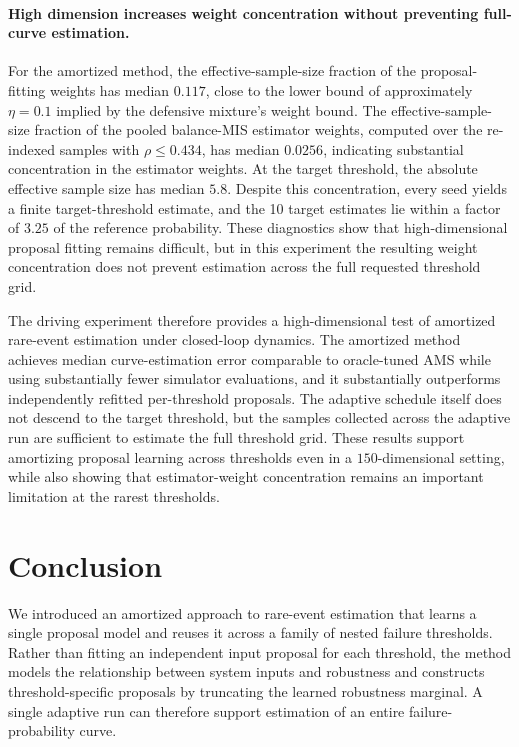 \documentclass[twoside,11pt]{article}
\begin{document}
\paragraph{High dimension increases weight concentration without preventing full-curve estimation.}
For the amortized method, the effective-sample-size fraction of the proposal-fitting weights has median \(0.117\), close to the lower bound of approximately \(\eta=0.1\) implied by the defensive mixture's weight bound. The effective-sample-size fraction of the pooled balance-MIS estimator weights, computed over the re-indexed samples with \(\rho\leq0.434\), has median \(0.0256\), indicating substantial concentration in the estimator weights. At the target threshold, the absolute effective sample size has median \(5.8\). Despite this concentration, every seed yields a finite target-threshold estimate, and the 10 target estimates lie within a factor of \(3.25\) of the reference probability. These diagnostics show that high-dimensional proposal fitting remains difficult, but in this experiment the resulting weight concentration does not prevent estimation across the full requested threshold grid.

The driving experiment therefore provides a high-dimensional test of amortized rare-event estimation under closed-loop dynamics. The amortized method achieves median curve-estimation error comparable to oracle-tuned AMS while using substantially fewer simulator evaluations, and it substantially outperforms independently refitted per-threshold proposals. The adaptive schedule itself does not descend to the target threshold, but the samples collected across the adaptive run are sufficient to estimate the full threshold grid. These results support amortizing proposal learning across thresholds even in a \(150\)-dimensional setting, while also showing that estimator-weight concentration remains an important limitation at the rarest thresholds.

\section{Conclusion}
\label{sec:conclusion}

We introduced an amortized approach to rare-event estimation that learns a single proposal model and reuses it across a family of nested failure thresholds. Rather than fitting an independent input proposal for each threshold, the method models the relationship between system inputs and robustness and constructs threshold-specific proposals by truncating the learned robustness marginal. A single adaptive run can therefore support estimation of an entire failure-probability curve.
\end{document}
